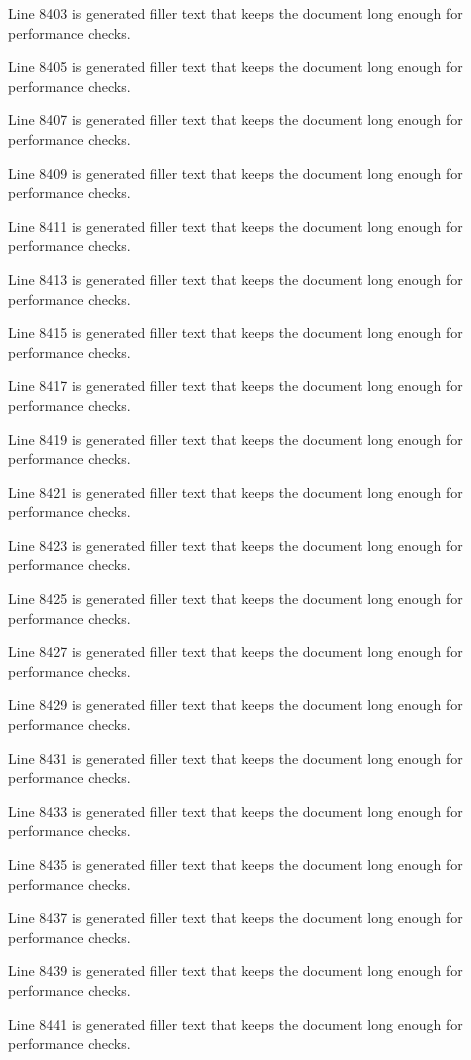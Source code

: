 Line 8403 is generated filler text that keeps the document long enough for performance checks.

Line 8405 is generated filler text that keeps the document long enough for performance checks.

Line 8407 is generated filler text that keeps the document long enough for performance checks.

Line 8409 is generated filler text that keeps the document long enough for performance checks.

Line 8411 is generated filler text that keeps the document long enough for performance checks.

Line 8413 is generated filler text that keeps the document long enough for performance checks.

Line 8415 is generated filler text that keeps the document long enough for performance checks.

Line 8417 is generated filler text that keeps the document long enough for performance checks.

Line 8419 is generated filler text that keeps the document long enough for performance checks.

Line 8421 is generated filler text that keeps the document long enough for performance checks.

Line 8423 is generated filler text that keeps the document long enough for performance checks.

Line 8425 is generated filler text that keeps the document long enough for performance checks.

Line 8427 is generated filler text that keeps the document long enough for performance checks.

Line 8429 is generated filler text that keeps the document long enough for performance checks.

Line 8431 is generated filler text that keeps the document long enough for performance checks.

Line 8433 is generated filler text that keeps the document long enough for performance checks.

Line 8435 is generated filler text that keeps the document long enough for performance checks.

Line 8437 is generated filler text that keeps the document long enough for performance checks.

Line 8439 is generated filler text that keeps the document long enough for performance checks.

Line 8441 is generated filler text that keeps the document long enough for performance checks.

